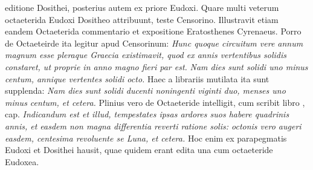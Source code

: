 editione Dosithei, posterius autem ex priore Eudoxi.
Quare
multi veterum octaeterida Eudoxi Dositheo attribuunt, teste Censorino.
%
Illustravit etiam eandem Octaeterida commentario et expositione
Eratosthenes Cyrenaeus.
Porro de Octaeteirde ita legitur apud
Censorinum: \textit{Hunc quoque circuitum vere annum magnum esse pleraque
Graecia existimavit, quod ex annis vertentibus solidis constaret,
ut proprie in anno magno fieri par est.}
\textit{Nam dies sunt solidi uno minus
centum, annique vertentes solidi octo.}
Haec a librariis mutilata
ita sunt supplenda: \textit{Nam dies sunt solidi ducenti noningenti viginti
duo, menses uno minus centum, et cetera.}
Plinius vero de Octaeteride
intelligit, cum scribit libro
 ,  cap. \textit{Indicandum est et
illud, tempestates ipsas ardores suos habere quadrinis annis, et easdem
non magna differentia reverti ratione solis: octonis vero augeri easdem,
centesima revoluente se Luna, et cetera.}
Hoc enim ex parapegmatis Eudoxi
et Dosithei hausit, quae quidem erant edita una cum octaeteride
Eudoxea.
%
